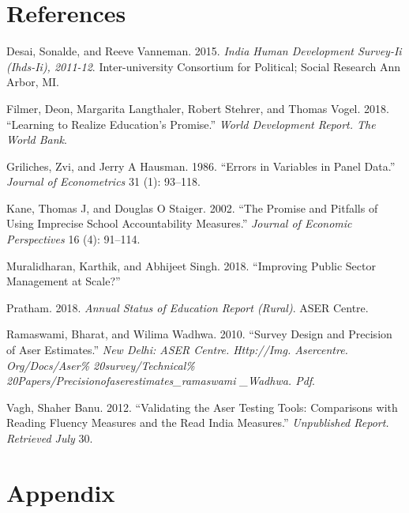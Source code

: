 \documentclass[
  11pt,
]{article}
\begin{document}
\newpage

\hypertarget{references}{%
\section{References}\label{references}}

\hypertarget{refs}{}
\leavevmode\hypertarget{ref-desai2015india}{}%
Desai, Sonalde, and Reeve Vanneman. 2015. \emph{India Human Development Survey-Ii (Ihds-Ii), 2011-12}. Inter-university Consortium for Political; Social Research Ann Arbor, MI.

\leavevmode\hypertarget{ref-filmer2018learning}{}%
Filmer, Deon, Margarita Langthaler, Robert Stehrer, and Thomas Vogel. 2018. ``Learning to Realize Education's Promise.'' \emph{World Development Report. The World Bank}.

\leavevmode\hypertarget{ref-griliches1986errors}{}%
Griliches, Zvi, and Jerry A Hausman. 1986. ``Errors in Variables in Panel Data.'' \emph{Journal of Econometrics} 31 (1): 93--118.

\leavevmode\hypertarget{ref-kane2002promise}{}%
Kane, Thomas J, and Douglas O Staiger. 2002. ``The Promise and Pitfalls of Using Imprecise School Accountability Measures.'' \emph{Journal of Economic Perspectives} 16 (4): 91--114.

\leavevmode\hypertarget{ref-muralidharan2018improving}{}%
Muralidharan, Karthik, and Abhijeet Singh. 2018. ``Improving Public Sector Management at Scale?''

\leavevmode\hypertarget{ref-aser2018}{}%
Pratham. 2018. \emph{Annual Status of Education Report (Rural)}. ASER Centre.

\leavevmode\hypertarget{ref-ramaswami2010survey}{}%
Ramaswami, Bharat, and Wilima Wadhwa. 2010. ``Survey Design and Precision of Aser Estimates.'' \emph{New Delhi: ASER Centre. Http://Img. Asercentre. Org/Docs/Aser\% 20survey/Technical\% 20Papers/Precisionofaserestimates\_ramaswami \_Wadhwa. Pdf}.

\leavevmode\hypertarget{ref-vagh2012validating}{}%
Vagh, Shaher Banu. 2012. ``Validating the Aser Testing Tools: Comparisons with Reading Fluency Measures and the Read India Measures.'' \emph{Unpublished Report. Retrieved July} 30.

\newpage

\hypertarget{appendix}{%
\section{Appendix}\label{appendix}}
\end{document}
